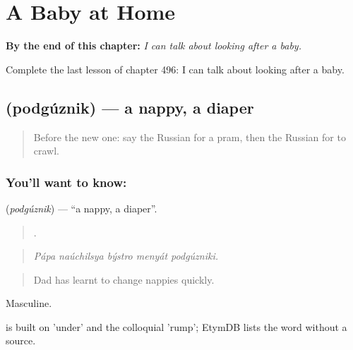 
\chapter{A Baby at Home}
\label{ch:ru-a-baby-at-home}

\begin{chapteropening}
\textbf{By the end of this chapter:} \emph{I can talk about looking after a baby.}

Complete the last lesson of chapter 496: I can talk about looking after a baby.
\end{chapteropening}

\section[\texorpdfstring{\ru{подгузник} (podgúznik)}{подгузник (podgúznik)}]{ (podgúznik) — a nappy, a diaper}

\label{lesson:RU-C496-podguznik}



\begin{quote}
Before the new one: say the Russian for a pram, then the Russian for to crawl.
\end{quote}

\subsection*{You'll want to know: }
\textbf{} (\emph{podgúznik}) — \textquotedblleft{}a nappy, a diaper\textquotedblright{}.

\begin{quote}
    .
\end{quote}

\begin{quote}
\emph{Pápa naúchilsya býstro menyát podgúzniki.}
\end{quote}

\begin{quote}
Dad has learnt to change nappies quickly.
\end{quote}

Masculine.

\begin{cousinweb}
\emph{} is built on \emph{} 'under' and the colloquial \emph{} 'rump'; EtymDB lists the word without a source.
\end{cousinweb}

